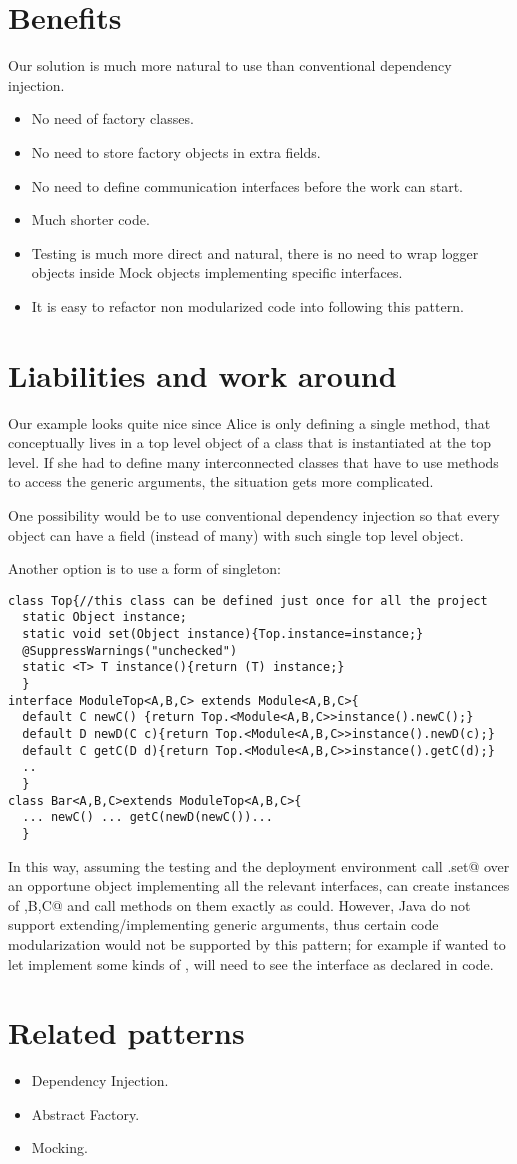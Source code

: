 \documentclass[submission,copyright,creativecommons]{eptcs}
\begin{document}
\section{Benefits}
Our solution is much more natural to use than conventional dependency injection.
\begin{itemize}
\item No need of factory classes.
\item No need to store factory objects in extra fields.
\item No need to define communication interfaces before the work can start.
\item Much shorter code.
\item Testing is much more direct and natural, there is no need
to wrap logger objects inside Mock objects implementing specific interfaces.
\item It is easy to refactor non modularized code into following this pattern.
\end{itemize}

\section{Liabilities and work around}
Our example looks quite nice since Alice is only defining a single
method, that conceptually lives in a top level object of a class that is
instantiated at the top level.
If she had to define many interconnected classes that have
to use \Q@Alice@ methods to access the generic arguments,
the situation gets more complicated.

One possibility would be to use conventional dependency injection
so that every object can have a field (instead of many) with
such single top level object.

Another option is to use a form of singleton:
\begin{lstlisting}
class Top{//this class can be defined just once for all the project
  static Object instance;
  static void set(Object instance){Top.instance=instance;}
  @SuppressWarnings("unchecked")
  static <T> T instance(){return (T) instance;}
  }
interface ModuleTop<A,B,C> extends Module<A,B,C>{
  default C newC() {return Top.<Module<A,B,C>>instance().newC();}
  default D newD(C c){return Top.<Module<A,B,C>>instance().newD(c);}
  default C getC(D d){return Top.<Module<A,B,C>>instance().getC(d);}
  ..
  }
class Bar<A,B,C>extends ModuleTop<A,B,C>{
  ... newC() ... getC(newD(newC())...
  }
\end{lstlisting}
In this way, assuming the testing and the deployment environment
call \Q@Top.set@ over an opportune object implementing all the relevant interfaces,
 \Q@Bar@ can create instances of \Q@A,B,C@ and call
methods on them exactly as \Q@Module@ could.
However, Java do not support extending/implementing generic arguments, thus
certain code modularization would not be supported by this pattern;
for example if \Q@Bob@ wanted to let \Q@Tim@ implement some kinds of \Q@Item@s,
\Q@Tim@ will need to see the \Q@Item@
 interface as declared in \Q@Bob@ code.

\section{Related patterns}
\begin{itemize}
\item Dependency Injection.
\item Abstract Factory.
\item Mocking.
\end{itemize}
\end{document}
